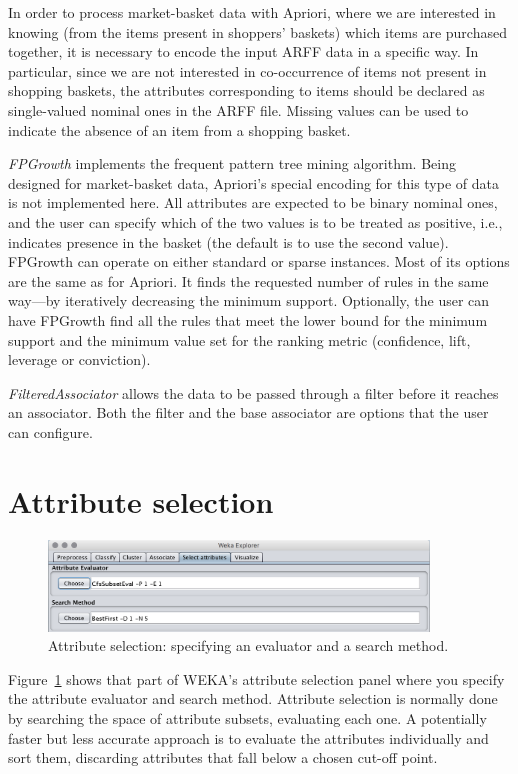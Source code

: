 In order to process market-basket data with Apriori, where we are
interested in knowing (from the items present in shoppers' baskets)
which items are purchased together, it is necessary to encode the
input ARFF data in a specific way. In particular, since we are not
interested in co-occurrence of items not present in shopping baskets,
the attributes corresponding to items should be declared as
single-valued nominal ones in the ARFF file. Missing values can be
used to indicate the absence of an item from a shopping basket.

\textit{FPGrowth} implements the frequent pattern tree mining
algorithm. Being designed for market-basket data, Apriori's special
encoding for this type of data is not implemented here. All attributes
are expected to be binary nominal ones, and the user can specify which
of the two values is to be treated as positive, i.e., indicates
presence in the basket (the default is to use the second
value). FPGrowth can operate on either standard or sparse
instances. Most of its options are the same as for Apriori. It finds
the requested number of rules in the same way---by iteratively
decreasing the minimum support. Optionally, the user can have FPGrowth
find all the rules that meet the lower bound for the minimum support
and the minimum value set for the ranking metric (confidence, lift,
leverage or conviction).

\textit{FilteredAssociator} allows the data to be passed through a
filter before it reaches an associator. Both the filter and the base
associator are options that the user can configure.

\section{Attribute selection}

\begin{figure}[!th]
\centering
\includegraphics[width=0.9\textwidth]{images/B2_30.png}
\caption{Attribute selection: specifying an evaluator and a search method.}
\label{fig:att_selection_config}
\end{figure}

Figure~\ref{fig:att_selection_config} shows that part of WEKA's
attribute selection panel where you specify the attribute evaluator
and search method. Attribute selection is normally done by searching
the space of attribute subsets, evaluating each one. A potentially
faster but less accurate approach is to evaluate the attributes
individually and sort them, discarding attributes that fall below a
chosen cut-off point.

